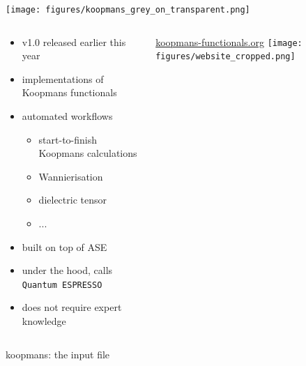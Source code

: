 \documentclass[xcolor=table,aspectratio=169]{beamer}
\numberwithin{equation}{section}
\begin{document}
\begin{frame}{}
   \begin{center}
      \texttt{[image: figures/koopmans\_grey\_on\_transparent.png]}
   \end{center}

   \vspace{-2ex}

   \begin{columns}
      \begin{column}{0.55\textwidth}
         \begin{itemize}
            \item v1.0 released earlier this year\footnotemark[1]
            \item implementations of Koopmans functionals
            \item automated workflows
                  \begin{itemize}
                     \item start-to-finish Koopmans calculations
                     \item Wannierisation
                     \item dielectric tensor
                     \item ...
                  \end{itemize}
            \item built on top of ASE\footnotemark[2]
            \item under the hood, calls \texttt{Quantum ESPRESSO}
            \item does not require expert knowledge
         \end{itemize}
      \end{column}

      \begin{column}{0.4\textwidth}
         \centering
         \url{koopmans-functionals.org}
         \texttt{[image: figures/website\_cropped.png]}
      \end{column}
   \end{columns}
\end{frame}

\begin{frame}{koopmans: the input file}
   \begin{minipage}[t]{0.475\columnwidth}
      \inputminted[fontsize=\tiny,breaklines,lastline=20]{json}{scripts/si.json}
   \end{minipage}
   \hspace{0.025\textwidth}
   \begin{minipage}[t]{0.475\columnwidth}
      \inputminted[fontsize=\tiny,breaklines,firstline=21]{json}{scripts/si.json}
   \end{minipage}
\end{frame}
\end{document}
